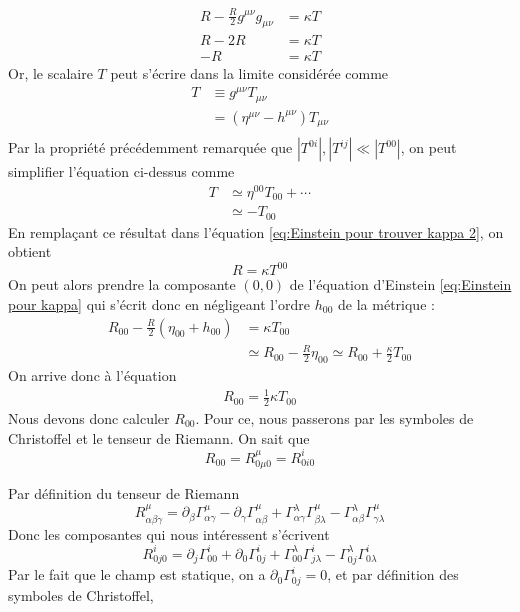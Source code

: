 \begin{align}
    R - \frac{R}{2}g^{\mu \nu}g_{\mu \nu} &= \kappa T\\
    R - 2R &= \kappa T\\
     -R &= \kappa T
    \label{eq:Einstein pour trouver kappa 2}
\end{align}
Or, le scalaire $T$ peut s'écrire dans la limite considérée comme
\begin{align}
    T & \equiv g^{\mu \nu}T_{\mu \nu}\\
    &= (\eta^{\mu \nu} - h^{\mu \nu} )T_{\mu \nu}\\
\end{align} 
Par la propriété précédemment remarquée que $|T^{0i}|,|T^{ij}| \ll |T^{00}|$, on peut simplifier l'équation ci-dessus comme
\begin{align}
    T& \simeq \eta^{00}T_{00} + \cdots\\
    &\simeq - T_{00}
\end{align}
En remplaçant ce résultat dans l'équation \ref{eq:Einstein pour trouver kappa 2}, on obtient
\begin{equation}
    R = \kappa T^{00}
\end{equation}
On peut alors prendre la composante $(0,0)$ de l'équation d'Einstein \ref{eq:Einstein pour kappa} qui s'écrit donc en négligeant l'ordre $h_{00}$ de la métrique :
\begin{align}
    R_{00} - \frac{R}{2}(\eta_{00} + h_{00}) &= \kappa T_{00}\\
     &\simeq R_{00} - \frac{R}{2} \eta_{00} \simeq R_{00} + \frac{\kappa}{2} T_{00}
\end{align}
On arrive donc à l'équation
\begin{align}
\label{eq: kappa intermediar}
    R_{00} = \frac{1}{2}\kappa T_{00}
\end{align}
Nous devons donc calculer $R_{00}$. Pour ce, nous passerons par les symboles de Christoffel et le tenseur de Riemann. On sait que
\begin{equation}
    R_{00} = R^{\mu}_{0\mu 0} = R^{i}_{0 i 0}
\end{equation}

Par définition du tenseur de Riemann 
\begin{equation}
    R^{\mu}_{\alpha \beta \gamma} = \partial_{\beta}\Gamma^{\mu}_{\alpha \gamma} - \partial_{\gamma} \Gamma^{\mu}_{\alpha \beta} + \Gamma^{\lambda}_{\alpha \gamma}\Gamma^{\mu}_{\beta \lambda} - \Gamma^{\lambda}_{\alpha \beta}\Gamma^{\mu}_{\gamma \lambda}
\end{equation}
Donc les composantes qui nous intéressent s'écrivent
\begin{equation}
    R^{i}_{0 j 0} = \partial_{j}\Gamma^{i}_{00} + \partial_{0} \Gamma^{i}_{0 j} + \Gamma^{\lambda}_{00}\Gamma^{i}_{j \lambda} - \Gamma^{\lambda}_{0 j}\Gamma^{i}_{0 \lambda}
    \label{eq:Tenseur de Riemman pour kappa}
\end{equation}
Par le fait que le champ est statique, on a $\partial_{0} \Gamma^{i}_{0 j} = 0$, et par définition des symboles de Christoffel,

